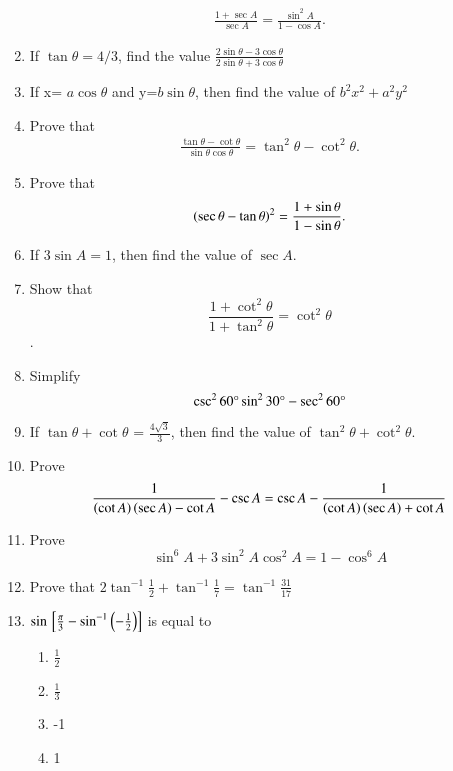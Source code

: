 \begin{enumerate}[label=\thesubsection.\arabic*,ref=\thesubsection.\theenumi,itemsep=1pt]
\begin{align*}
\frac{1+\sec A}{\sec A}=\frac{\sin^2 A}{1-\cos A} 
.\end{align*}
\hfill{}\item If  $\tan \theta = 4/3$, find the value 
$\frac{2\sin \theta -3\cos \theta}{2\sin\theta+3\cos\theta}$
\hfill{}\item If x=  $a\cos\theta$ and y=$b\sin\theta$, then find the value of   $b^2x^2+a^2y^2$
\hfill{}\item Prove that 
\begin{align*}
\frac{\tan\theta-\cot\theta}{\sin\theta\cos\theta}=\tan^2\theta-\cot^2\theta 
.\end{align*}
\hfill{}\item Prove that
\begin{align*}
\left(\sec\theta-\tan\theta\right)^2 =\frac{1+\sin\theta}{1-\sin\theta}
.\end{align*}
		\hfill{}\item If $3\sin A = 1$, then find the value of $\sec A$.
		\hfill{}\item Show that $$\frac{1 + \cot^2{\theta}}{1 + \tan^2{\theta}} = \cot^2{\theta}$$.
\hfill{}\item Simplify $${\csc^{2}{60\degree} \sin^{2}{30\degree} - \sec^{2}{60\degree}}$$
	\hfill{}\item If $\tan{\theta} + \cot{\theta}$ = $\frac{4 \sqrt{3}}{3}$, then find the value of $\tan^{2}{\theta} + \cot^{2}{\theta}$. 
		\hfill{}\item Prove$$\frac{1}{\left(\cot A\right)\left(\sec A\right) - \cot A} - \csc A = \csc A - \frac{1}{\left(\cot A\right)\left(\sec A\right) + \cot A}$$
		\hfill{}\item Prove$$\sin^{6} A + 3\sin^{2} A \cos^{2} A = 1 - \cos^{6}  A$$
		\hfill{}
\item Prove that $2\tan^{-1}\frac{1}{2} + \tan^{-1}\frac{1}{7} = \tan^{-1}\frac{31}{17}$
\hfill{}
\item $ \sin {}\left[\frac{\pi}{3}-\sin^{-1}\left(-\frac{1}{2}\right)\right] $ is equal to
\begin{multicols}{4}
\begin{enumerate}
\item $\frac{1}{2}$
\item $\frac{1}{3}$
\item -1
\item 1
\end{enumerate}

\end{multicols}
\end{enumerate}
